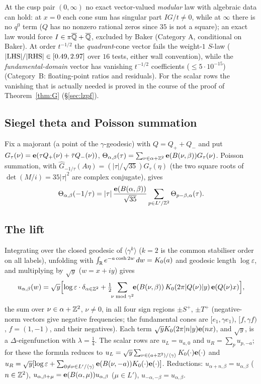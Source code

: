 At the cusp pair $(0,\infty)$ no exact vector-valued \emph{modular} law with algebraic data can hold: at $x=0$ each cone sum has singular part
$IG/t\neq0$, while at $\infty$ there is no $q^0$ term ($Q$ has no nonzero rational zeros since $35$ is not a square); an exact law would force
$I\in\pi\overline{\mathbb{Q}}+\overline{\mathbb{Q}}$, excluded by Baker (Category A, conditional on Baker).
At order $t^{-1/2}$ the \emph{quadrant}-cone vector fails the weight-$1$ $S$-law ($|{\rm LHS}|/|{\rm RHS}|\in[0.49,2.97]$ over $16$ tests,
either wall convention), while the \emph{fundamental-domain} vector has vanishing $t^{-1/2}$ coefficients ($\le5\cdot10^{-15}$) (Category~B:
floating-point ratios and residuals). For the scalar rows the vanishing that is actually needed is proved in the course of the proof of
Theorem~\ref{thm:G} (\S\ref{sec:lzpf}).

\subsection{Siegel theta and Poisson summation}
Fix a majorant (a point of the $\gamma$-geodesic) with $Q=Q_++Q_-$ and put $G_\tau(\nu)=\mathbf{e}(\tau Q_+(\nu)+\bar\tau Q_-(\nu))$,
$\Theta_{\alpha,\beta}(\tau)=\sum_{\nu\in\alpha+\mathbb{Z}^2}\mathbf{e}(B(\nu,\beta))G_\tau(\nu)$. Poisson summation, with
$\widehat G_{-1/\tau}(A\eta)=(|\tau|/\sqrt{35})G_\tau(\eta)$ (the two square roots of $\det(M/i)=35|\tau|^2$ are complex conjugate), gives
\begin{equation}\label{eq:thetaS}
\Theta_{\alpha,\beta}(-1/\tau)=|\tau|\,\frac{\mathbf{e}(B(\alpha,\beta))}{\sqrt{35}}\sum_{p\in L'/\mathbb{Z}^2}\Theta_{p-\beta,\alpha}(\tau).
\end{equation}

\subsection{The lift}\label{sec:liftpf}
Integrating over the closed geodesic of $\langle\gamma^k\rangle$ ($k=2$ is the common stabiliser order on all labels), unfolding with
$\int_{\mathbb{R}} e^{-a\cosh2w}\,dw=K_0(a)$ and geodesic length $\log\varepsilon$, and multiplying by $\sqrt y$ ($w=x+iy$) gives
\[
u_{\alpha,\beta}(w)=\sqrt y\Bigl[\log\varepsilon\cdot\delta_{\alpha\in\mathbb{Z}^2}+\tfrac12\!\!\sum_{\nu\bmod\gamma^2}\!\!\mathbf{e}(B(\nu,\beta))\,K_0(2\pi|Q(\nu)|y)\,\mathbf{e}(Q(\nu)x)\Bigr],
\]
the sum over $\nu\in\alpha+\mathbb{Z}^2$, $\nu\neq0$, in all four sign regions $\pm S^+$, $\pm T^+$ (negative-norm vectors give negative frequencies; the
fundamental cones are $[e_1,\gamma e_1)$, $[f,\gamma f)$, $f=(1,-1)$, and their negatives). Each term $\sqrt yK_0(2\pi|n|y)\mathbf{e}(nx)$, and $\sqrt y$,
is a $\Delta$-eigenfunction with $\lambda=\tfrac14$. The scalar rows are $u_L=u_{a,0}$ and $u_R=\sum_pu_{p,-a}$; for these the formula reduces to
$u_L=\sqrt y\sum_{\nu\in(a+\mathbb{Z}^2)/\langle\gamma\rangle}K_0(\cdot)\mathbf{e}(\cdot)$ and
$u_R=\sqrt y[\log\varepsilon+\sum_{0\neq\nu\in L'/\langle\gamma\rangle}\mathbf{e}(B(\nu,-a))K_0(\cdot)\mathbf{e}(\cdot)]$.
Reductions: $u_{\alpha+n,\beta}=u_{\alpha,\beta}$ ($n\in\mathbb{Z}^2$), $u_{\alpha,\beta+\mu}=\mathbf{e}(B(\alpha,\mu))u_{\alpha,\beta}$ ($\mu\in L'$),
$u_{-\alpha,-\beta}=u_{\alpha,\beta}$.

